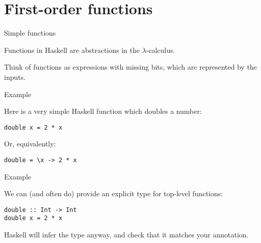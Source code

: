 
\section{First-order functions}

%
\begin{frame}[fragile]{Simple functions}

Functions in Haskell are abstractions in the $\lambda$-calculus. 

Think of functions as expressions with missing bits, which are represented by
the inputs.

\end{frame}


%
\begin{frame}[fragile]{Example}

Here is a very simple Haskell function which doubles a number:

\begin{block}{}
\begin{verbatim}
double x = 2 * x
\end{verbatim}
\end{block}

Or, equivalently:

\begin{block}{}
\begin{verbatim}
double = \x -> 2 * x
\end{verbatim}
\end{block}

\end{frame}

%
\begin{frame}[fragile]{Example}

We can (and often do) provide an explicit type for top-level functions:

\begin{block}{}
\begin{verbatim}
double :: Int -> Int
double x = 2 * x
\end{verbatim}
\end{block}

Haskell will infer the type anyway, and check that it matches your annotation.

\end{frame}

